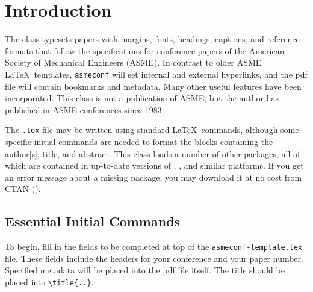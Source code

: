 \documentclass[captionpatch,colorlinks,upint,subscriptcorrection,varvw,mathalfa=cal=boondoxo,german]{asmeconf}
\begin{document}
\begin{nomenclature}



\end{nomenclature}


\section{Introduction}
The \texttt{} class typesets papers with margins, fonts, headings, captions, and reference formats that follow the specifications for conference papers of the American Society of Mechanical Engineers (ASME). In contrast to older ASME \LaTeX\ templates, \texttt{asmeconf} will set internal and external hyperlinks, and the pdf file will contain bookmarks and metadata. Many other useful features have been incorporated. This class is not a publication of ASME, but the author has published in ASME conferences since 1983. 

The \texttt{.tex} file may be written using standard \LaTeX\ commands, although some specific initial commands are needed to format the blocks containing the author[s], title, and abstract.  This class loads a number of other packages, all of which are contained in up-to-date versions of , , and similar platforms. If you get an error message about a missing package, you may download it at no cost from CTAN (). 

\subsection{Essential Initial Commands}

To begin, fill in the fields to be completed at top of the \texttt{asmeconf-template.tex} file. These fields include the headers for your conference and your paper number. Specified metadata will be placed into the pdf file itself. 
The title should be placed into \verb|\title{..}|. 
\end{document}
